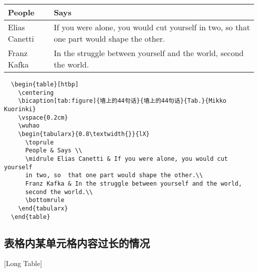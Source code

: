 \begin{table}[htbp]
  \centering
  \vspace{0.2cm}
  \wuhao
  \begin{tabularx}{0.8\textwidth{}}{lX}
    \toprule
    People        & Says                                                 \\
    \midrule
    Elias Canetti & If you were alone, you would cut yourself in two, so
    that one part would shape the other.                                 \\
    Franz Kafka   & In the struggle between yourself and the world,
    second the world.                                                    \\
    \bottomrule
  \end{tabularx}
\end{table}

\begin{lstlisting}
  \begin{table}[htbp]
    \centering
    \bicaption[tab:figure]{墙上的44句话}{墙上的44句话}{Tab.}{Mikko Kuorinki}
    \vspace{0.2cm}
    \wuhao
    \begin{tabularx}{0.8\textwidth{}}{lX}
      \toprule
      People & Says \\
      \midrule Elias Canetti & If you were alone, you would cut yourself
      in two, so  that one part would shape the other.\\
      Franz Kafka & In the struggle between yourself and the world,
      second the world.\\
      \bottomrule
    \end{tabularx}
  \end{table}
\end{lstlisting}

\subsection{表格内某单元格内容过长的情况}[Long Table]

